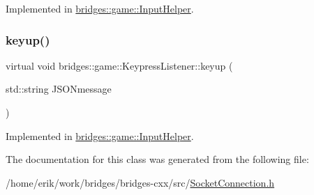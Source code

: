 Implemented in \hyperlink{classbridges_1_1game_1_1_input_helper_aac75c2b1abf28afa4acaf730e925f301}{bridges\+::game\+::\+Input\+Helper}.

\mbox{\label{classbridges_1_1game_1_1_keypress_listener_a21d9f085819e30c41f3964ea2276964d}} 
\subsubsection{\texorpdfstring{keyup()}{keyup()}}
{\footnotesize\ttfamily virtual void bridges\+::game\+::\+Keypress\+Listener\+::keyup (\begin{DoxyParamCaption}\item[{std\+::string}]{J\+S\+O\+Nmessage }\end{DoxyParamCaption})\hspace{0.3cm}{\ttfamily [pure virtual]}}



Implemented in \hyperlink{classbridges_1_1game_1_1_input_helper_aa847f19c6f68ebbb63d73802abfcd9a0}{bridges\+::game\+::\+Input\+Helper}.



The documentation for this class was generated from the following file\+:\begin{DoxyCompactItemize}
\item 
/home/erik/work/bridges/bridges-\/cxx/src/\hyperlink{_socket_connection_8h}{Socket\+Connection.\+h}\end{DoxyCompactItemize}
